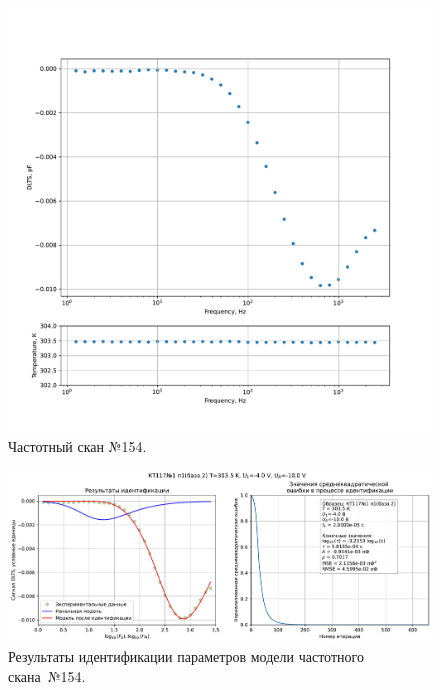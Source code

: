 \begin{figure}[!ht]
    \centering
    \includegraphics[width=1\textwidth]{../plots/КТ117№1_п1(база 2)_2500Гц-1Гц_1пФ_+30С_-4В-10В_200мВ_20мкс_шаг_0,1.pdf}
    \caption{Частотный скан №154.}
    \label{pic:frequency_scan_154}
\end{figure}

\begin{figure}[!ht]
    \centering
    \includegraphics[width=1\textwidth]{../plots/КТ117№1_п1(база 2)_2500Гц-1Гц_1пФ_+30С_-4В-10В_200мВ_20мкс_шаг_0,1_model.pdf}
    \caption{Результаты идентификации параметров модели частотного скана~№154.}
    \label{pic:frequency_scan_model154}
\end{figure}

\pagebreak



